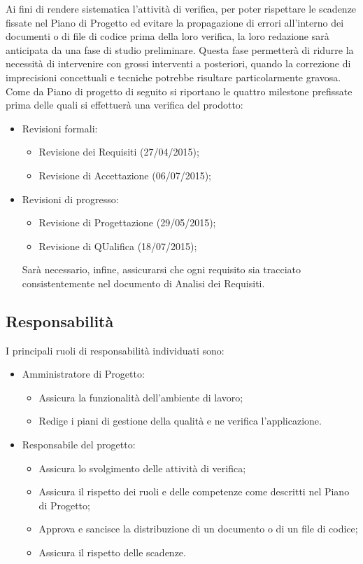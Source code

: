 Ai fini di rendere sistematica l'attività di verifica, per poter rispettare le scadenze fissate nel Piano di Progetto ed evitare la propagazione di errori all'interno dei documenti o di file di codice prima della loro verifica, la loro redazione sarà anticipata da una fase di studio preliminare.
Questa fase permetterà di ridurre la necessità di intervenire con grossi interventi a posteriori, quando la correzione di imprecisioni concettuali e tecniche potrebbe risultare particolarmente gravosa.
Come da Piano di progetto di seguito si riportano le quattro milestone prefissate prima delle quali si effettuerà una verifica del prodotto:
\begin{itemize}

\item Revisioni formali:
\begin{itemize}
\item Revisione dei Requisiti (27/04/2015);
\item Revisione di Accettazione (06/07/2015);
\end{itemize}

\item Revisioni di progresso:
\begin{itemize}
\item Revisione di Progettazione (29/05/2015);
\item Revisione di QUalifica (18/07/2015);
\end{itemize}
Sarà necessario, infine, assicurarsi che ogni requisito sia tracciato consistentemente nel documento di Analisi dei Requisiti.
\end{itemize}
\subsection{Responsabilità}

I principali ruoli di responsabilità individuati sono:
\begin{itemize}
\item Amministratore di Progetto:
\begin{itemize}
\item Assicura la funzionalità dell'ambiente di lavoro;
\item Redige i piani di gestione della qualità e ne verifica l'applicazione.
\end{itemize}

\item Responsabile del progetto:
\begin{itemize}
\item Assicura lo svolgimento delle attività di verifica;
\item Assicura il rispetto dei ruoli e delle competenze come descritti nel Piano di Progetto;
\item Approva e sancisce la distribuzione di un documento o di un file di codice;
\item Assicura il rispetto delle scadenze.
\end{itemize}
\end{itemize}


